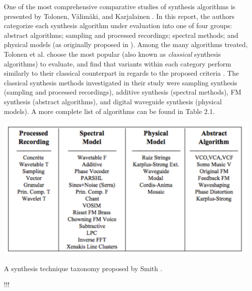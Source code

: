 \documentclass[a4paper,12pt]{report} 	%
\numberwithin{figure}{chapter}
\numberwithin{table}{chapter}
\numberwithin{equation}{chapter}
\begin{document}
\begin{flushleft}
One of the most comprehensive comparative studies of synthesis algorithms is presented by Tolonen, V\aa lim\aa ki, and Karjalainen \cite{Tolonen:1998bh}. In this report, the authors categorize each synthesis algorithm under evaluation into one of four groups: abstract algorithms; sampling and processed recordings; spectral methods; and physical models (as originally proposed in \cite{III:1991hc}). Among the many algorithms treated, Tolonen et al. choose the most popular (also known as \emph{classical} synthesis algorithms) to evaluate, and find that variants within each category perform similarly to their classical counterpart in regards to the proposed criteria \cite[p. 101]{Tolonen:1998bh}. The classical synthesis methods investigated in their study were sampling synthesis (sampling and processed recordings), additive synthesis (spectral methods), FM synthesis (abstract algorithms), and digital waveguide synthesis (physical models). A more complete list of algorithms can be found in Table 2.1.
\\
\begin{table}[h!]
\begin{center}
\includegraphics[scale=0.7]{SynthesisTechniqueTaxonomy}
\caption[Synthesis Technique Taxonomy]{A synthesis technique taxonomy proposed by Smith \protect\cite{III:1991hc}.}
\end{center}
\end{table}
!!!


\end{flushleft}
\end{document}
